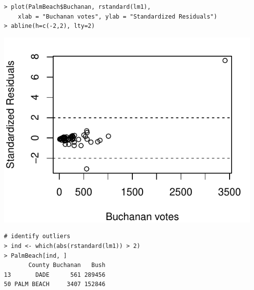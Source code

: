 \documentclass[10pt]{beamer}
\begin{document}
\begin{frame}[fragile]
\begin{verbatim}
> plot(PalmBeach$Buchanan, rstandard(lm1),
    xlab = "Buchanan votes", ylab = "Standardized Residuals")
> abline(h=c(-2,2), lty=2)
\end{verbatim}
\begin{center}
\includegraphics[scale=0.7]{figure/election_resid.pdf}
\end{center}
\end{frame}

\begin{frame}[fragile]
\begin{verbatim}
# identify outliers
> ind <- which(abs(rstandard(lm1)) > 2)
> PalmBeach[ind, ]
       County Buchanan   Bush
13       DADE      561 289456
50 PALM BEACH     3407 152846
\end{verbatim}
\end{frame}
\end{document}
